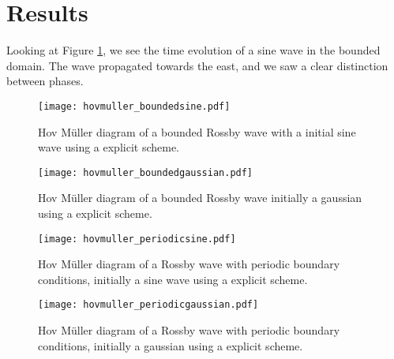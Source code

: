 \section{Results}
\label{sec:results}

Looking at Figure \ref{fig:hovmullerSineBounded}, we see the time evolution of a sine wave in the bounded domain. The wave propagated towards the east, and we saw a clear distinction between phases.
\begin{figure}[htbp]
	\centering
	\texttt{[image: hovmuller\_boundedsine.pdf]}
	\caption{Hov Müller diagram of a bounded Rossby wave with a initial sine wave using a explicit scheme.}
	\label{fig:hovmullerSineBounded}
\end{figure}

\begin{figure}[htbp]
	\centering
	\texttt{[image: hovmuller\_boundedgaussian.pdf]}
	\caption{Hov Müller diagram of a bounded Rossby wave initially a gaussian using a explicit scheme.}
	\label{fig:hovmullerGaussianBounded}
\end{figure}

\begin{figure}[htbp]
	\centering
	\texttt{[image: hovmuller\_periodicsine.pdf]}
	\caption{Hov Müller diagram of a Rossby wave with periodic boundary conditions, initially a sine wave using a explicit scheme.}
	\label{fig:hovmullerSinePeriodic}
\end{figure}

\begin{figure}[htbp]
	\centering
	\texttt{[image: hovmuller\_periodicgaussian.pdf]}
	\caption{Hov Müller diagram of a Rossby wave with periodic boundary conditions, initially a gaussian using a explicit scheme.}
	\label{fig:hovmullerGaussianPeriodic}
\end{figure}

